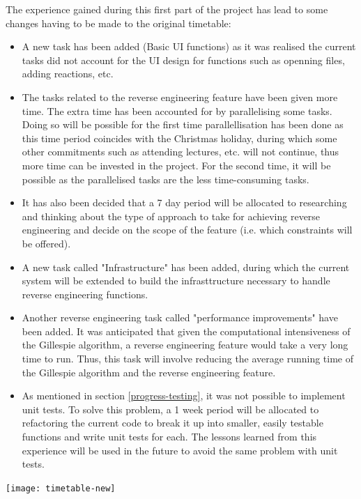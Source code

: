 \documentclass{article}
\begin{document}
		The experience gained during this first part of the project has lead to some changes having to be made to the original timetable:
	\begin{itemize}
		
		
		\item A new task has been added (Basic UI functions) as it was realised the current tasks did not account for the UI design for functions such as openning files, adding reactions, etc.
		
		\item The tasks related to the reverse engineering feature have been given more time. The extra time has been accounted for by parallelising some tasks. Doing so will be possible for the first time parallellisation has been done as this time period coincides with the Christmas holiday, during which some other commitments such as attending lectures, etc. will not continue, thus more time can be invested in the project. For the second time, it will be possible as the parallelised tasks are the less time-consuming tasks.
		\item It has also been decided that a 7 day period will be allocated to researching and thinking about the type of approach to take for achieving reverse engineering and decide on the scope of the feature (i.e. which constraints will be offered).
		\item A new task called "Infrastructure" has been added, during which the current system will be extended to build the infrasttructure necessary to handle reverse engineering functions.
		\item Another reverse engineering task called "performance improvements" have been added. It was anticipated that given the computational intensiveness of the Gillespie algorithm, a reverse engineering feature would take a very long time to run. Thus, this task will involve reducing the average running time of the Gillespie algorithm and the reverse engineering feature.
		\item As mentioned in section \ref{progress-testing}, it was not possible to implement unit tests. To solve this problem, a 1 week period will be allocated to refactoring the current code to break it up into smaller, easily testable functions and write unit tests for each. The lessons learned from this experience will be used in the future to avoid the same problem with unit tests.
	\end{itemize}
	
	\texttt{[image: timetable-new]}
	
\end{document}
